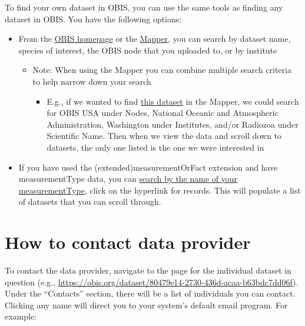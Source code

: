 \documentclass[
  letterpaper,
  DIV=11,
  numbers=noendperiod,
  oneside]{scrreprt}
\providecommand{\tightlist}{%
  \setlength{\itemsep}{0pt}\setlength{\parskip}{0pt}}\usepackage{longtable,booktabs,array}
\begin{document}
To find your own dataset in OBIS, you can use the same tools as finding
any dataset in OBIS. You have the following options:

\begin{itemize}
\tightlist
\item
  From the \href{https://obis.org/}{OBIS homepage} or the
  \href{https://mapper.obis.org/}{Mapper}, you can search by dataset
  name, species of interest, the OBIS node that you uploaded to, or by
  institute

  \begin{itemize}
  \tightlist
  \item
    Note: When using the Mapper you can combine multiple search criteria
    to help narrow down your search

    \begin{itemize}
    \tightlist
    \item
      E.g., if we wanted to find
      \href{https://obis.org/dataset/80479e14-2730-436d-acaa-b63bdc7dd06f}{this
      dataset} in the Mapper, we could search for OBIS USA under Nodes,
      National Oceanic and Atmospheric Administration, Washington under
      Institutes, and/or Radiozoa under Scientific Name. Then when we
      view the data and scroll down to datasets, the only one listed is
      the one we were interested in
    \end{itemize}
  \end{itemize}
\item
  If you have used the (extended)measurementOrFact extension and have
  measurementType data, you can \href{https://mof.obis.org/}{search by
  the name of your measurementType}, click on the hyperlink for records.
  This will populate a list of datasets that you can scroll through.
\end{itemize}

\hypertarget{how-to-contact-data-provider}{%
\section{How to contact data
provider}\label{how-to-contact-data-provider}}

To contact the data provider, navigate to the page for the individual
dataset in question (e.g.,
\url{https://obis.org/dataset/80479e14-2730-436d-acaa-b63bdc7dd06f}).
Under the ``Contacts'' section, there will be a list of individuals you
can contact. Clicking any name will direct you to your system's default
email program. For example:
\end{document}
